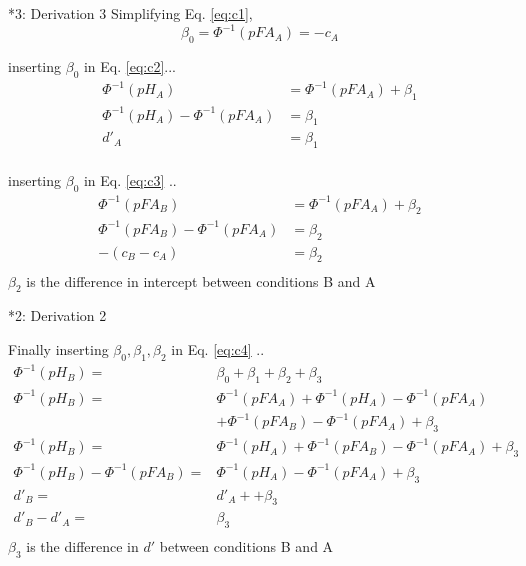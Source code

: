 \documentclass[10pt]{beamer}
\begin{document}
\begin{frame}{*3: Derivation 3}
Simplifying Eq. \autoref{eq:c1}, 
$$
\beta_0  = \Phi^{-1}(pFA_{A}) = -c_A
$$

inserting $\beta_0$ in Eq. \autoref{eq:c2}...
\begin{align*}
\Phi^{-1}(pH_{A}) & = \Phi^{-1}(pFA_{A}) + \beta_1\\
\Phi^{-1}(pH_{A}) - \Phi^{-1}(pFA_{A}) & =  \beta_1\\
d'_A & = \beta_1 \\
\end{align*}

inserting $\beta_0$ in Eq. \autoref{eq:c3} ..
\begin{align*}
\Phi^{-1}(pFA_{B}) & = \Phi^{-1}(pFA_{A})  + \beta_2 \\
\Phi^{-1}(pFA_{B}) - \Phi^{-1}(pFA_{A}) & =  \beta_2 \\
- (c_B - c_A) & =  \beta_2 \\
\end{align*}
$\beta_2$ is the difference in intercept between conditions B and A\\
\end{frame}

\begin{frame}{*2: Derivation 2}

Finally inserting $\beta_0, \beta_1, \beta_2$ in Eq. \autoref{eq:c4} ..
\begin{align*}
\Phi^{-1}(pH_{B}) = & \beta_0 + \beta_1 + \beta_2 + \beta_3\\
\Phi^{-1}(pH_{B}) = & \Phi^{-1}(pFA_{A}) + \Phi^{-1}(pH_{A}) - \Phi^{-1}(pFA_{A}) \\
& + \Phi^{-1}(pFA_{B}) - \Phi^{-1}(pFA_{A}) + \beta_3\\
\Phi^{-1}(pH_{B}) = & \Phi^{-1}(pH_{A}) + \Phi^{-1}(pFA_{B}) - \Phi^{-1}(pFA_{A}) + \beta_3\\
\Phi^{-1}(pH_{B}) - \Phi^{-1}(pFA_{B}) = & \Phi^{-1}(pH_{A}) - \Phi^{-1}(pFA_{A}) + \beta_3\\
d'_B = & d'_A + + \beta_3\\
d'_B - d'_A = & \beta_3\\
\end{align*}
$\beta_3$ is the difference in  $d'$ between conditions B and A
\end{frame}
\end{document}
